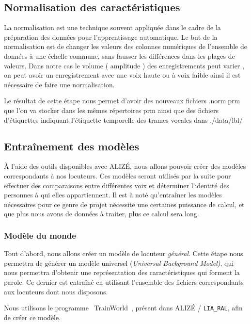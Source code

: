 \documentclass[a4paper, 12pt]{book}
\newcounter{program}[subsection]
\begin{document}
\subsection{Normalisation des caractéristiques}

La normalisation est une technique souvent appliquée dans le cadre de la préparation des données pour l'apprentissage automatique. Le but de la normalisation est de changer les valeurs des colonnes numériques de l'ensemble de données à une échelle commune, sans fausser les différences dans les plages de valeurs. Dans notre cas le volume (  amplitude ) des enregistrements peut varier , on peut avoir un enregistrement avec une voix haute ou à voix faible ainsi il est nécessaire de faire une normalisation.

Le résultat de cette étape nous permet d'avoir des nouveaux fichiers .norm.prm que l'on va stocker dans les mêmes répertoires prm ainsi que des fichiers d'étiquettes indiquant l'étiquette temporelle des trames vocales dans ./data/lbl/

\subsection{Entraînement des modèles}

À l'aide des outils disponibles avec ALIZÉ, nous allons pouvoir créer des modèles correspondants à nos locuteurs. Ces modèles seront utilisés par la suite pour effectuer des comparaisons entre différentes voix et déterminer l'identité des personnes à qui elles appartiennent. Il est à noté qu'entraîner les modèles nécessaires pour ce genre de projet nécessite une certaines puissance de calcul, et que plus nous avons de données à traiter, plus ce calcul sera long.

\subsubsection{Modèle du monde}

Tout d'abord, nous allons créer un modèle de locuteur \textit{général}. Cette étape nous permettra de générer un modèle universel (\textit{Universal Background Model)}, qui nous permettra d'obtenir une représentation des caractéristiques qui forment la parole. Ce dernier est entraîné en utilisant l'ensemble des fichiers correspondants aux locuteurs dont nous disposons. 

Nous utilisons le programme \guillemotleft{}~TrainWorld~\guillemotright{}, présent dans ALIZÉ / \texttt{LIA\_RAL}, afin de créer ce modèle.
\end{document}
